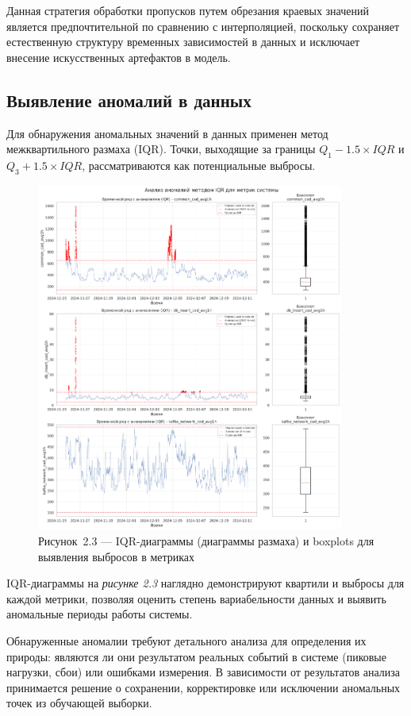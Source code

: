 \hspace*{1.25cm}Данная стратегия обработки пропусков путем обрезания краевых значений является предпочтительной по сравнению с интерполяцией, поскольку сохраняет естественную структуру временных зависимостей в данных и исключает внесение искусственных артефактов в модель.

\subsection{Выявление аномалий в данных}

\hspace*{1.25cm}Для обнаружения аномальных значений в данных применен метод межквартильного размаха (IQR). Точки, выходящие за границы $Q_1 - 1.5 \times IQR$ и $Q_3 + 1.5 \times IQR$, рассматриваются как потенциальные выбросы.

\begin{figure}[H]
	\centering
	\includegraphics[width=0.9\textwidth]{figures/chapter2/outliers_boxplot.png}
	\caption*{Рисунок~2.3 --- IQR-диаграммы (диаграммы размаха) и boxplots для выявления выбросов в метриках}
	\label{fig:outliers_analysis}
\end{figure}

\hspace*{1.25cm}IQR-диаграммы на \textit{рисунке 2.3} наглядно демонстрируют квартили и выбросы для каждой метрики, позволяя оценить степень вариабельности данных и выявить аномальные периоды работы системы.

\hspace*{1.25cm}Обнаруженные аномалии требуют детального анализа для определения их природы: являются ли они результатом реальных событий в системе (пиковые нагрузки, сбои) или ошибками измерения. В зависимости от результатов анализа принимается решение о сохранении, корректировке или исключении аномальных точек из обучающей выборки. 